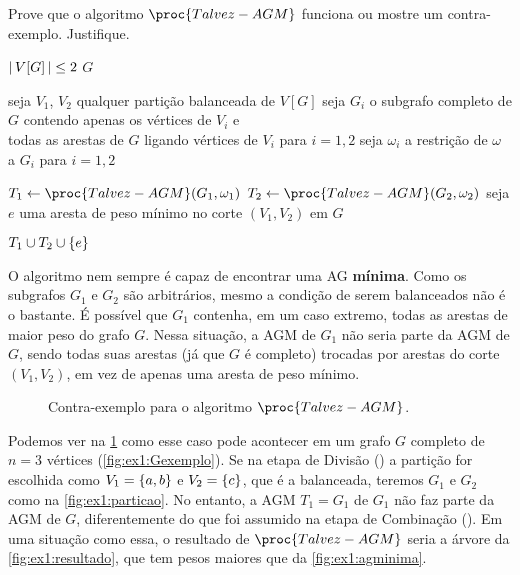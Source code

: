 Prove que o algoritmo $\proc{Talvez-AGM}$ funciona ou mostre um contra-exemplo.
Justifique.

\begin{codebox}

    \li \Se ${\left\lvert\,V[G]\,\right\rvert} \leq 2$ \Entao \Devolva $G$

    \li seja $V_1$, $V_2$ qualquer partição balanceada de $V[G]$
        \label{linha:ex1:divisao}
    \li seja $G_i$ o subgrafo completo de $G$ contendo apenas os vértices de $V_i$ e \\
    \qquad todas as arestas de $G$ ligando vértices de $V_i$ para $i=1,2$
    \li seja $\omega_i$ a restrição de $\omega$ a $G_i$ para $i=1,2$

    \li $T_1 \Recebe \proc{Talvez-AGM}(G_1, \omega_1)$
    \li $T_2 \Recebe \proc{Talvez-AGM}(G_2, \omega_2)$
    \li seja $e$ uma aresta de peso mínimo no corte $(V_1, V_2)$ em $G$

    \li \Devolva $T_1 \cup T_2 \cup \set{e}$
        \label{linha:ex1:combinacao}
\end{codebox}

\itemdsep
\newpage

O algoritmo nem sempre é capaz de encontrar uma AG \textbf{mínima}. Como os subgrafos $G_1$ e $G_2$ são arbitrários, mesmo a condição de serem balanceados não é o bastante. É possível que $G_1$ contenha, em um caso extremo, todas as arestas de maior peso do grafo $G$. Nessa situação, a AGM de $G_1$ não seria parte da AGM de $G$, sendo todas suas arestas (já que $G$ é completo) trocadas por arestas do corte $(V_1,V_2)$, em vez de apenas uma aresta de peso mínimo.

\begin{figure}[H]
    \centering
    

    \caption{Contra-exemplo para o algoritmo $\proc{Talvez-AGM}$.}
    \label{fig:ex1}
\end{figure}

Podemos ver na \cref{fig:ex1} como esse caso pode acontecer em um grafo $G$ completo de $n = 3$ vértices (\cref{fig:ex1:Gexemplo}). Se na etapa de Divisão () a partição for escolhida como $V_1 = \set{a, b}$ e $V_2 = \set{c}$, que é a balanceada, teremos $G_1$ e $G_2$ como na \cref{fig:ex1:particao}. No entanto, a AGM $T_1 = G_1$ de $G_1$ não faz parte da AGM de $G$, diferentemente do que foi assumido na etapa de Combinação (). Em uma situação como essa, o resultado de $\proc{Talvez-AGM}$ seria a árvore da \cref{fig:ex1:resultado}, que tem pesos maiores que da \cref{fig:ex1:agminima}.
